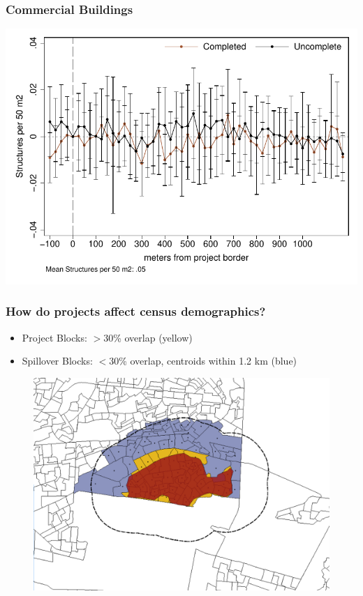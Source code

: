 \documentclass[aspectratio=149]{beamer}
\begin{document}
\begin{frame}
\frametitle{Commercial Buildings}
\begin{center}
\includegraphics[scale=.78]{distplot_bblu_shops.pdf}
\vspace{-3mm}
\end{center}
\end{frame}


\begin{frame}
\frametitle{How do projects affect census demographics?}
\begin{itemize}
  \item Project Blocks: $>$30\% overlap (yellow)
  \item Spillover Blocks: $<$30\% overlap, centroids within 1.2 km (blue)
\end{itemize}
\begin{center}
\begin{figure}
\includegraphics[scale=0.27]{design_7.png}
\vspace{-3mm}
\end{figure}
\end{center}
\end{frame}
\end{document}
